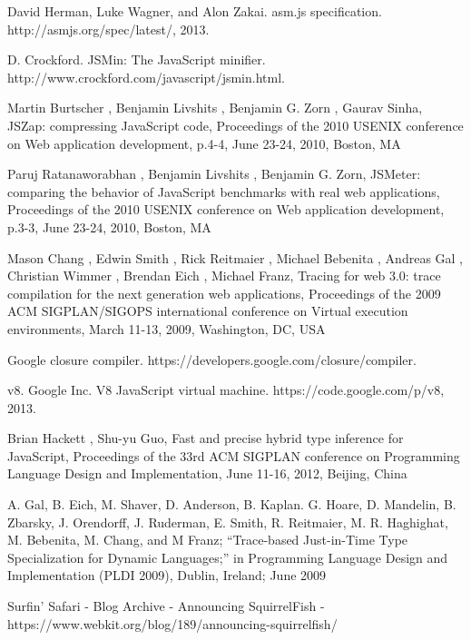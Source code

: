 \documentclass[preprint,10pt]{sigplanconf}
\begin{document}
\begin{thebibliography}{}
\softraggedright


\bibitem{} David Herman, Luke Wagner, and Alon Zakai. asm.js specification. http://asmjs.org/spec/latest/, 2013.

\bibitem{} D. Crockford. JSMin: The JavaScript minifier. http://www.crockford.com/javascript/jsmin.html.

\bibitem{} Martin Burtscher , Benjamin Livshits , Benjamin G. Zorn , Gaurav Sinha, JSZap: compressing JavaScript code, Proceedings of the 2010 USENIX conference on Web application development, p.4-4, June 23-24, 2010, Boston, MA

\bibitem{} Paruj Ratanaworabhan , Benjamin Livshits , Benjamin G. Zorn, JSMeter: comparing the behavior of JavaScript benchmarks with real web applications, Proceedings of the 2010 USENIX conference on Web application development, p.3-3, June 23-24, 2010, Boston, MA

\bibitem{} Mason Chang , Edwin Smith , Rick Reitmaier , Michael Bebenita , Andreas Gal , Christian Wimmer , Brendan Eich , Michael Franz, Tracing for web 3.0: trace compilation for the next generation web applications, Proceedings of the 2009 ACM SIGPLAN/SIGOPS international conference on Virtual execution environments, March 11-13, 2009, Washington, DC, USA

\bibitem{} Google closure compiler. https://developers.google.com/closure/compiler.

\bibitem{} v8. Google Inc. V8 JavaScript virtual machine. https://code.google.com/p/v8, 2013.

\bibitem{} Brian Hackett , Shu-yu Guo, Fast and precise hybrid type inference for JavaScript, Proceedings of the 33rd ACM SIGPLAN conference on Programming Language Design and Implementation, June 11-16, 2012, Beijing, China

\bibitem{} A. Gal, B. Eich, M. Shaver, D. Anderson, B. Kaplan. G. Hoare, D. Mandelin, B. Zbarsky, J. Orendorff, J. Ruderman, E. Smith, R. Reitmaier, M. R. Haghighat, M. Bebenita, M. Chang, and M Franz; ``Trace-based Just-in-Time Type Specialization for Dynamic Languages;'' in Programming Language Design and Implementation (PLDI 2009), Dublin, Ireland; June 2009

\bibitem{} Surfin’ Safari - Blog Archive - Announcing SquirrelFish - https://www.webkit.org/blog/189/announcing-squirrelfish/


\end{thebibliography}
\end{document}
